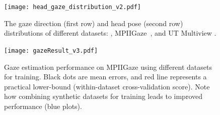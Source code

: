 


\begin{figure}
    \centering
    \texttt{[image: head\_gaze\_distribution\_v2.pdf]}
    \caption{The gaze direction (first row) and head pose (second row) distributions of different datasets: \dataset, MPIIGaze~\cite{zhang15_cvpr}, and UT Multiview \cite{sugano2014learning}.}
    \label{fig:head_gaze_distribution}
\end{figure}

\begin{figure}
    \centering
    \texttt{[image: gazeResult\_v3.pdf]}
    \caption{Gaze estimation performance on MPIIGaze using different datasets for training. Black dots are mean errors, and red line represents a practical lower-bound (within-dataset cross-validation score). Note how combining synthetic datasets for training leads to improved performance (blue plots).}
    \label{fig:gazeResult}
\end{figure}

